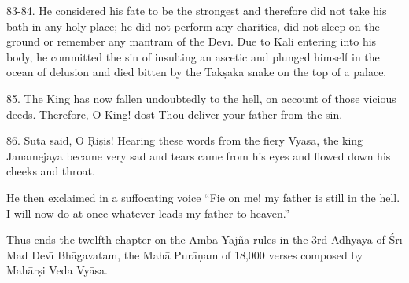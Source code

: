 83-84. He considered his fate to be the strongest and therefore did not take his bath in any holy place; he did not perform any charities, did not sleep on the ground or remember any mantram of the Dev\={\i}. Due to Kali entering into his body, he committed the sin of insulting an ascetic and plunged himself in the ocean of delusion and died bitten by the Tak\d{s}aka snake on the top of a palace.

85. The King has now fallen undoubtedly to the hell, on account of those vicious deeds. Therefore, O King! dost Thou deliver your father from the sin.

86. S\=uta said, O \d{R}i\d{s}is! Hearing these words from the fiery Vy\=asa, the king Janamejaya became very sad and tears came from his eyes and flowed down his cheeks and throat.

He then exclaimed in a suffocating voice ``Fie on me! my father is still in the hell. I will now do at once whatever leads my father to heaven.''

Thus ends the twelfth chapter on the Amb\=a Yaj\~na rules in the 3rd Adhy\=aya of \'Sr\={\i} Mad Dev\={\i} Bh\=agavatam, the Mah\=a Pur\=a\d{n}am of 18,000 verses composed by Mah\=ar\d{s}i Veda Vy\=asa.



